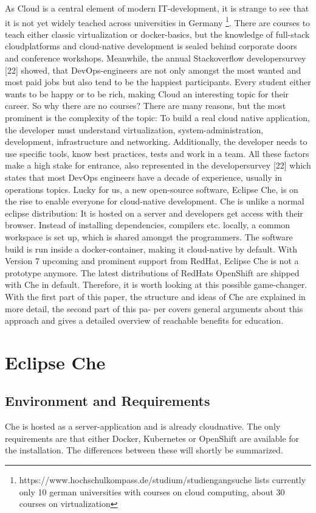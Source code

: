 \documentclass[utf8,biblatex]{lni}
\begin{document}
As Cloud is a central element of modern IT-development, it is strange to see that it is not yet widely teached across 
universities in Germany \footnote{https://www.hochschulkompass.de/studium/studiengangsuche lists currently only 10 german universities with courses on cloud computing, about 30 courses on virtualization }.
There are courses to teach either classic virtualization or docker-basics, but the knowledge of full-stack cloudplatforms and cloud-native development is sealed behind corporate doors and conference workshops.
Meanwhile,  the  annual  Stackoverflow  developersurvey [22] showed, that DevOps-engineers are not only 
amongst the most wanted and most paid jobs but also tend to be the happiest participants.  
Every student either wants to be happy or to be rich, making Cloud an interesting topic for their career. 
So why there are no courses? There are many reasons, but the most prominent is the complexity of the topic: 
To build a real cloud native application, the developer must understand virtualization, system-administration, development, 
infrastructure  and  networking. 
Additionally, the developer needs to use specific tools, know best practices, tests and work in a team.
All these factors make a high stake for entrance, also  represented in the developersurvey [22] which states that most DevOps engineers have a decade of experience, usually in operations topics.
Lucky for us, a new open-source software, Eclipse Che, is on the rise to enable everyone for cloud-native development.
Che is unlike a normal eclipse distribution: 
It is hosted on a server and developers get access with their browser. 
Instead of installing dependencies, compilers etc. locally, a common workspace is set up, which is shared amongst the programmers. 
The software build is run inside a docker-container, making it cloud-native by default. 
With Version 7 upcoming and prominent support from RedHat, Eclipse Che is not a prototype anymore. 
The latest distributions of RedHats OpenShift are shipped with Che in default. 
Therefore, it is worth looking at this possible game-changer. 
With the first part of this paper, the structure and ideas of Che are explained in more detail, the second part of this pa-
per covers general arguments about this approach and gives a detailed overview of reachable benefits for education.    

\section{Eclipse Che}
\subsection{Environment and Requirements}
Che is hosted as a server-application and is already cloudnative. 
The only requirements are that either Docker, Kubernetes or OpenShift are available for the installation.
The differences between these will shortly be summarized.
 
\end{document}
